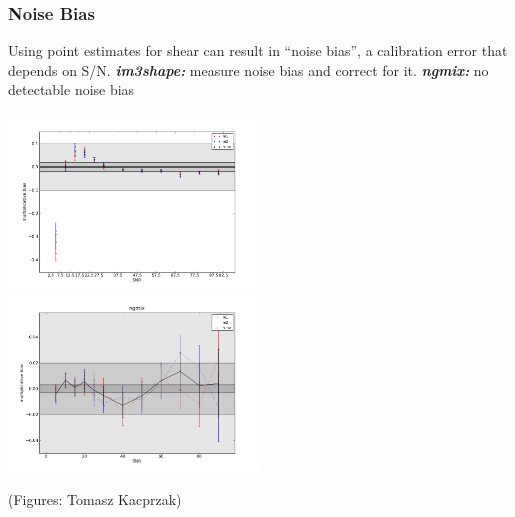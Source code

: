 \documentclass{beamer}
\begin{document}
\frame
{
    \frametitle{Noise Bias}

    Using point estimates for shear can result in ``noise bias'',
    a calibration error that depends on S/N.
    \newline
    {\bf {\em im3shape:}}  measure noise bias and correct for it.
    \newline
    {\bf {\em ngmix:}} no detectable noise bias

    \begin{center}
        \includegraphics[width=0.5\textwidth]{noise-bias-im3shape.png}
        \includegraphics[width=0.5\textwidth]{noise-bias-ngmix.png}
    \end{center}
    {\tiny (Figures: Tomasz Kacprzak)}
}
\end{document}
